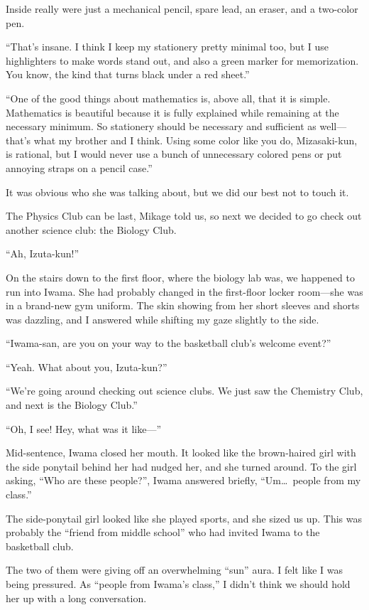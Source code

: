 \documentclass[
    a4paper,
    12pt,
    twoside,
    openany,
    UTF8,
    fontset=windows
]{ctexbook}
\begin{document}
Inside really were just a mechanical pencil, spare lead, an eraser, and a two-color pen.

``That's insane. I think I keep my stationery pretty minimal too, but I use highlighters to make words stand out, and also a green marker for memorization. You know, the kind that turns black under a red sheet.''

``One of the good things about mathematics is, above all, that it is simple. Mathematics is beautiful because it is fully explained while remaining at the necessary minimum. So stationery should be necessary and sufficient as well---that's what my brother and I think. Using some color like you do, Mizasaki-kun, is rational, but I would never use a bunch of unnecessary colored pens or put annoying straps on a pencil case.''

It was obvious who she was talking about, but we did our best not to touch it.

The Physics Club can be last, Mikage told us, so next we decided to go check out another science club: the Biology Club.

``Ah, Izuta-kun!''

On the stairs down to the first floor, where the biology lab was, we happened to run into Iwama. She had probably changed in the first-floor locker room---she was in a brand-new gym uniform. The skin showing from her short sleeves and shorts was dazzling, and I answered while shifting my gaze slightly to the side.

``Iwama-san, are you on your way to the basketball club's welcome event?''

``Yeah. What about you, Izuta-kun?''

``We're going around checking out science clubs. We just saw the Chemistry Club, and next is the Biology Club.''

``Oh, I see! Hey, what was it like---''

Mid-sentence, Iwama closed her mouth. It looked like the brown-haired girl with the side ponytail behind her had nudged her, and she turned around. To the girl asking, ``Who are these people?'', Iwama answered briefly, ``Um\dots\ people from my class.''

The side-ponytail girl looked like she played sports, and she sized us up. This was probably the ``friend from middle school'' who had invited Iwama to the basketball club.

The two of them were giving off an overwhelming ``sun'' aura. I felt like I was being pressured. As ``people from Iwama's class,'' I didn't think we should hold her up with a long conversation.
\end{document}
